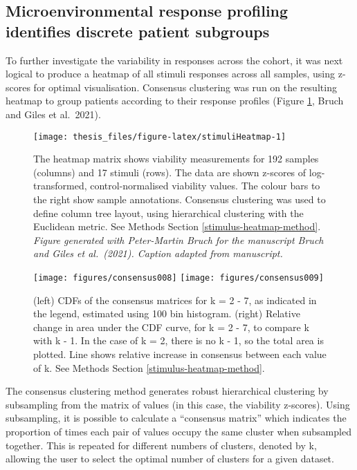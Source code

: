 \documentclass[11pt, a4paper, twosided]{book}
\begin{document}
\hypertarget{clusters}{%
\subsection{Microenvironmental response profiling identifies discrete patient subgroups}\label{clusters}}

To further investigate the variability in responses across the cohort, it was next logical to produce a heatmap of all stimuli responses across all samples, using z-scores for optimal visualisation. Consensus clustering was run on the resulting heatmap to group patients according to their response profiles (Figure \ref{fig:stimuliHeatmap}, Bruch and Giles et al.~2021).


\begin{figure}[h]

{\centering \texttt{[image: thesis\_files/figure-latex/stimuliHeatmap-1]} 

}

\caption{The heatmap matrix shows viability measurements for 192 samples (columns) and 17 stimuli (rows). The data are shown z-scores of log-transformed, control-normalised viability values. The colour bars to the right show sample annotations. Consensus clustering was used to define column tree layout, using hierarchical clustering with the Euclidean metric. See Methods Section \ref{stimulus-heatmap-method}. \emph{Figure generated with Peter-Martin Bruch for the manuscript Bruch and Giles et al.~(2021). Caption adapted from manuscript.}}\label{fig:stimuliHeatmap}
\end{figure}

\begin{figure}[h]

{\centering \texttt{[image: figures/consensus008]} \texttt{[image: figures/consensus009]} 

}

\caption{(left) CDFs of the consensus matrices for k = 2 - 7, as indicated in the legend, estimated using 100 bin histogram. (right) Relative change in area under the CDF curve, for k = 2 - 7, to compare k with k - 1. In the case of k = 2, there is no k - 1, so the total area is plotted. Line shows relative increase in consensus between each value of k. See Methods Section \ref{stimulus-heatmap-method}.}\label{fig:consensusClusteringA}
\end{figure}
The consensus clustering method generates robust hierarchical clustering by subsampling from the matrix of values (in this case, the viability z-scores). Using subsampling, it is possible to calculate a ``consensus matrix'' which indicates the proportion of times each pair of values occupy the same cluster when subsampled together. This is repeated for different numbers of clusters, denoted by k, allowing the user to select the optimal number of clusters for a given dataset.
\end{document}
